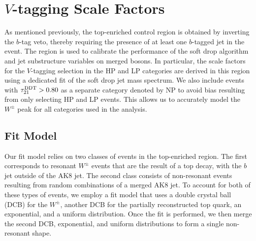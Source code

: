 
\section{$V$-tagging Scale Factors}
\label{sec:vTag}

As mentioned previously, the top-enriched control region is obtained by inverting the $b$-tag veto, thereby requiring the presence of at least one $b$-tagged jet in the event.
The region is used to calibrate the performance of the soft drop algorithm and jet substructure variables on merged bosons.
In particular, the scale factors for the $V$-tagging selection in the HP and LP categories are derived in this region using a dedicated fit of the soft drop jet mass spectrum.
We also include events with $\tau_{21}^\mathrm{DDT}>0.80$ as a separate category denoted by NP to avoid bias resulting from only selecting HP and LP events.
This allows us to accurately model the $W^\pm$ peak for all categories used in the analysis.

\subsection{Fit Model}

Our fit model relies on two classes of events in the top-enriched region.
The first corresponds to resonant $W^\pm$ events that are the result of a top decay, with the $b$ jet outside of the AK8 jet.
The second class consists of non-resonant events resulting from random combinations of a merged AK8 jet.
To account for both of these types of events, we employ a fit model that uses a double crystal ball (DCB) for the $W^\pm$, another DCB for the partially reconstructed top quark, an exponential, and a uniform distribution.
Once the fit is performed, we then merge the second DCB, exponential, and uniform distributions to form a single non-resonant shape.

